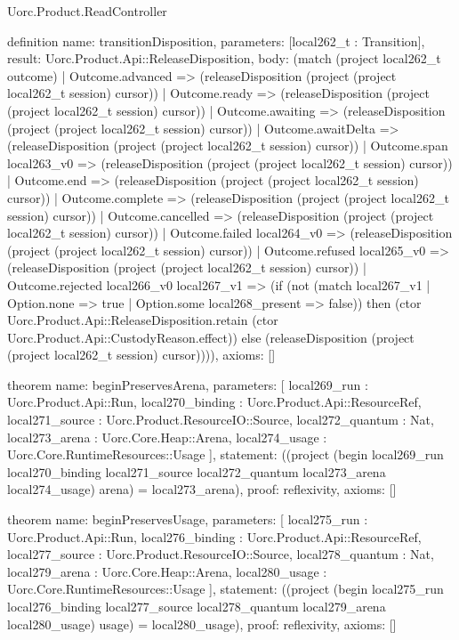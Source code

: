 \begin{lexlean}{Uorc.Product.ReadController}
\begin{semanticmodule}
definition{
  name: transitionDisposition,
  parameters: [local262_t : Transition],
  result: Uorc.Product.Api::ReleaseDisposition,
  body: (match (project local262_t outcome)
    | Outcome.advanced => (releaseDisposition (project (project local262_t session) cursor))
    | Outcome.ready => (releaseDisposition (project (project local262_t session) cursor))
    | Outcome.awaiting => (releaseDisposition (project (project local262_t session) cursor))
    | Outcome.awaitDelta => (releaseDisposition (project (project local262_t session) cursor))
    | Outcome.span local263_v0 => (releaseDisposition (project (project local262_t session) cursor))
    | Outcome.end => (releaseDisposition (project (project local262_t session) cursor))
    | Outcome.complete => (releaseDisposition (project (project local262_t session) cursor))
    | Outcome.cancelled => (releaseDisposition (project (project local262_t session) cursor))
    | Outcome.failed local264_v0 => (releaseDisposition (project (project local262_t session) cursor))
    | Outcome.refused local265_v0 => (releaseDisposition (project (project local262_t session) cursor))
    | Outcome.rejected local266_v0 local267_v1 => (if (not (match local267_v1
      | Option.none => true
      | Option.some local268_present => false)) then (ctor Uorc.Product.Api::ReleaseDisposition.retain (ctor Uorc.Product.Api::CustodyReason.effect)) else (releaseDisposition (project (project local262_t session) cursor)))),
  axioms: []
}

theorem{
  name: beginPreservesArena,
  parameters: [
    local269_run : Uorc.Product.Api::Run,
    local270_binding : Uorc.Product.Api::ResourceRef,
    local271_source : Uorc.Product.ResourceIO::Source,
    local272_quantum : Nat,
    local273_arena : Uorc.Core.Heap::Arena,
    local274_usage : Uorc.Core.RuntimeResources::Usage
  ],
  statement: ((project (begin local269_run local270_binding local271_source local272_quantum local273_arena local274_usage) arena) = local273_arena),
  proof: reflexivity{},
  axioms: []
}

theorem{
  name: beginPreservesUsage,
  parameters: [
    local275_run : Uorc.Product.Api::Run,
    local276_binding : Uorc.Product.Api::ResourceRef,
    local277_source : Uorc.Product.ResourceIO::Source,
    local278_quantum : Nat,
    local279_arena : Uorc.Core.Heap::Arena,
    local280_usage : Uorc.Core.RuntimeResources::Usage
  ],
  statement: ((project (begin local275_run local276_binding local277_source local278_quantum local279_arena local280_usage) usage) = local280_usage),
  proof: reflexivity{},
  axioms: []
}
\end{semanticmodule}
\end{lexlean}

